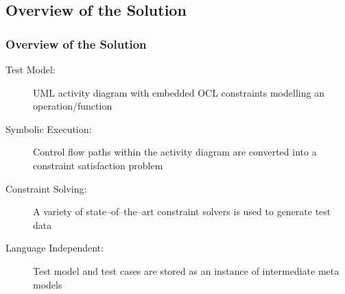 \documentclass{beamer}
\begin{document}
\subsection{Overview of the Solution}
\begin{frame}
\frametitle{Overview of the Solution}
\begin{description}
\item[Test Model:] UML activity diagram with embedded OCL constraints modelling an operation/function
\item[Symbolic Execution:] Control flow paths within the activity diagram are converted into a constraint satisfaction problem
\item[Constraint Solving:] A variety of state--of--the--art constraint solvers is used to generate test data
\item[Language Independent:] Test model and test cases are stored as an instance of intermediate meta models
\end{description}
\end{frame}
\end{document}
